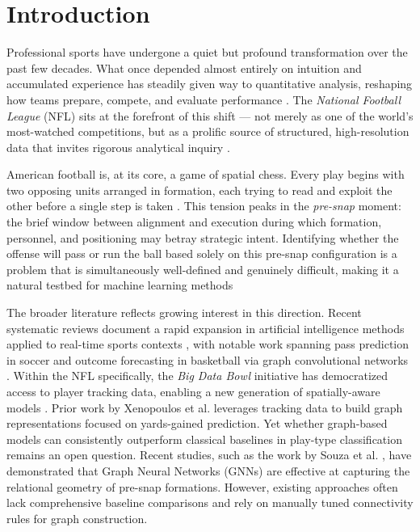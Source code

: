 \documentclass[runningheads]{llncs}
\begin{document}
\section{Introduction}
\label{sec:introduction}

Professional sports have undergone a quiet but profound transformation over the past few decades. What once depended almost entirely on intuition and accumulated experience has steadily given way to quantitative analysis, reshaping how teams prepare, compete, and evaluate performance \cite{Alamar2013}. The \textit{National Football League} (NFL) sits at the forefront of this shift — not merely as one of the world's most-watched competitions, but as a prolific source of structured, high-resolution data that invites rigorous analytical inquiry \cite{Leeds2013}.

American football is, at its core, a game of spatial chess. Every play begins with two opposing units arranged in formation, each trying to read and exploit the other before a single step is taken \cite{Guttmann2004}. This tension peaks in the \textit{pre-snap} moment: the brief window between alignment and execution during which formation, personnel, and positioning may betray strategic intent. Identifying whether the offense will pass or run the ball based solely on this pre-snap configuration is a problem that is simultaneously well-defined and genuinely difficult, making it a natural testbed for machine learning methods 
\cite{Fernandes2020,Otting2021}

The broader literature reflects growing interest in this direction. Recent systematic reviews document a rapid expansion in artificial intelligence methods applied to real-time sports contexts \cite{vec2024trends}, with notable work spanning pass prediction in soccer \cite{rico2023machine} and outcome forecasting in basketball via graph convolutional networks \cite{zhao2023enhancing}. Within the NFL specifically, the \textit{Big Data Bowl} initiative has democratized access to player tracking data, enabling a new generation of spatially-aware models \cite{Lopez2020}. Prior work by Xenopoulos et al. \cite{Xenopoulos2021} leverages tracking data to build graph representations focused on yards-gained prediction. Yet whether graph-based models can consistently outperform classical baselines in play-type classification remains an open question. Recent studies, such as the work by Souza et al. \cite{souza2025nfl}, have demonstrated that Graph Neural Networks (GNNs) are effective at capturing the relational geometry of pre-snap formations. However, existing approaches often lack comprehensive baseline comparisons and rely on manually tuned connectivity rules for graph construction. 
\end{document}
